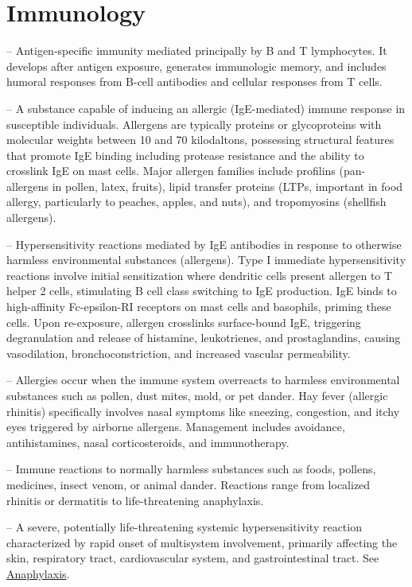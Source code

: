 \chapter{Immunology}

-- Antigen-specific immunity mediated principally by B and T lymphocytes. It develops after antigen exposure, generates immunologic memory, and includes humoral responses from B-cell antibodies and cellular responses from T cells.

-- A substance capable of inducing an allergic (IgE-mediated) immune response in susceptible individuals. Allergens are typically proteins or glycoproteins with molecular weights between 10 and 70 kilodaltons, possessing structural features that promote IgE binding including protease resistance and the ability to crosslink IgE on mast cells. Major allergen families include profilins (pan-allergens in pollen, latex, fruits), lipid transfer proteins (LTPs, important in food allergy, particularly to peaches, apples, and nuts), and tropomyosins (shellfish allergens).

-- Hypersensitivity reactions mediated by IgE antibodies in response to otherwise harmless environmental substances (allergens). Type I immediate hypersensitivity reactions involve initial sensitization where dendritic cells present allergen to T helper 2 cells, stimulating B cell class switching to IgE production. IgE binds to high-affinity Fc-epsilon-RI receptors on mast cells and basophils, priming these cells. Upon re-exposure, allergen crosslinks surface-bound IgE, triggering degranulation and release of histamine, leukotrienes, and prostaglandins, causing vasodilation, bronchoconstriction, and increased vascular permeability.

-- Allergies occur when the immune system overreacts to harmless environmental substances such as pollen, dust mites, mold, or pet dander. Hay fever (allergic rhinitis) specifically involves nasal symptoms like sneezing, congestion, and itchy eyes triggered by airborne allergens. Management includes avoidance, antihistamines, nasal corticosteroids, and immunotherapy.

-- Immune reactions to normally harmless substances such as foods, pollens, medicines, insect venom, or animal dander. Reactions range from localized rhinitis or dermatitis to life-threatening anaphylaxis.

-- A severe, potentially life-threatening systemic hypersensitivity reaction characterized by rapid onset of multisystem involvement, primarily affecting the skin, respiratory tract, cardiovascular system, and gastrointestinal tract. See \hyperlink{Anaphylaxis}{Anaphylaxis}.

